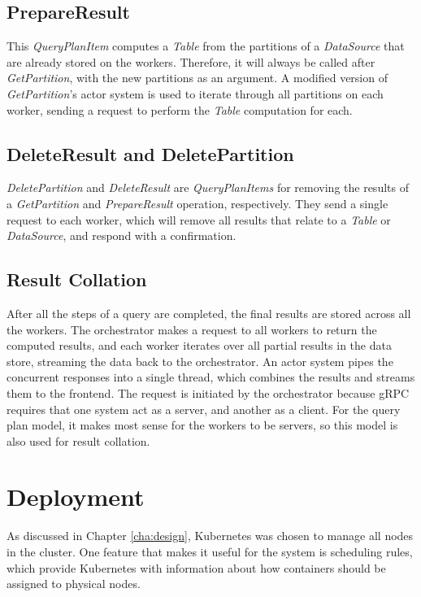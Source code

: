 \subsection{PrepareResult}
This \textit{QueryPlanItem} computes a \textit{Table} from the partitions of a \textit{DataSource} that are already stored on the workers. Therefore, it will always be called after \textit{GetPartition}, with the new partitions as an argument. A modified version of \textit{GetPartition}'s actor system is used to iterate through all partitions on each worker, sending a request to perform the \textit{Table} computation for each.

\subsection{DeleteResult and DeletePartition}
\textit{DeletePartition} and \textit{DeleteResult} are \textit{QueryPlanItems} for removing the results of a \textit{GetPartition} and \textit{PrepareResult} operation, respectively. They send a single request to each worker, which will remove all results that relate to a \textit{Table} or \textit{DataSource}, and respond with a confirmation.

\subsection{Result Collation}
After all the steps of a query are completed, the final results are stored across all the workers. The orchestrator makes a request to all workers to return the computed results, and each worker iterates over all partial results in the data store, streaming the data back to the orchestrator. An actor system pipes the concurrent responses into a single thread, which combines the results and streams them to the frontend. The request is initiated by the orchestrator because gRPC requires that one system act as a server, and another as a client. For the query plan model, it makes most sense for the workers to be servers, so this model is also used for result collation.

\section{Deployment}
As discussed in Chapter \ref{cha:design}, Kubernetes was chosen to manage all nodes in the cluster. One feature that makes it useful for the system is scheduling rules, which provide Kubernetes with information about how containers should be assigned to physical nodes.

